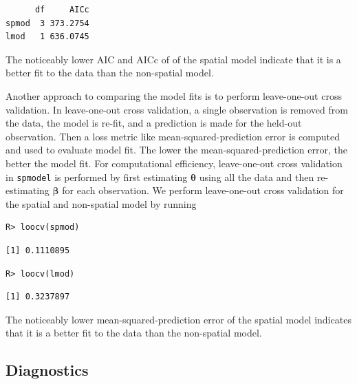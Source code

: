 \documentclass{article}
\begin{document}
\begin{verbatim}
      df     AICc
spmod  3 373.2754
lmod   1 636.0745
\end{verbatim}

The noticeably lower AIC and AICc of of the spatial model indicate that
it is a better fit to the data than the non-spatial model.

Another approach to comparing the model fits is to perform leave-one-out
cross validation. In leave-one-out cross validation, a single
observation is removed from the data, the model is re-fit, and a
prediction is made for the held-out observation. Then a loss metric like
mean-squared-prediction error is computed and used to evaluate model
fit. The lower the mean-squared-prediction error, the better the model
fit. For computational efficiency, leave-one-out cross validation in
\texttt{spmodel} is performed by first estimating
\(\boldsymbol{\theta}\) using all the data and then re-estimating
\(\boldsymbol{\beta}\) for each observation. We perform leave-one-out
cross validation for the spatial and non-spatial model by running

\begin{verbatim}
R> loocv(spmod)
\end{verbatim}

\begin{verbatim}
[1] 0.1110895
\end{verbatim}

\begin{verbatim}
R> loocv(lmod)
\end{verbatim}

\begin{verbatim}
[1] 0.3237897
\end{verbatim}

The noticeably lower mean-squared-prediction error of the spatial model
indicates that it is a better fit to the data than the non-spatial
model.

\hypertarget{diagnostics}{%
\subsection{Diagnostics}\label{diagnostics}}
\end{document}
